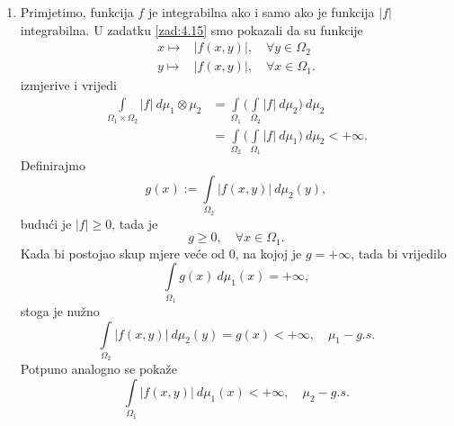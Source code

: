 \begin{rj}[\ref{zad:4.16}]
    \begin{enumerate}[label=(\roman*)]
        \item   \label{rj:4.16.1}
        Primjetimo, funkcija $f$ je integrabilna ako i samo ako je funkcija $|f|$ integrabilna.
        U zadatku \ref{zad:4.15} smo pokazali da su funkcije
        \begin{equation*}
            \begin{aligned}
                x \mapsto& |f (x, y)|, \quad \forall y \in \Omega_2\\
                y \mapsto& |f (x, y)|, \quad \forall x \in \Omega_1.
            \end{aligned}
        \end{equation*}
        izmjerive i vrijedi
        \begin{equation*}
            \begin{aligned}
                \int\limits_{\Omega_1 \times \Omega_2} |f| \: d \mu_1 \otimes \mu_2 &= \int\limits_{\Omega_1} \Big( \int\limits_{\Omega_2} |f| \: d \mu_2 \Big) \: d \mu_2\\
                &= \int\limits_{\Omega_2} \Big( \int\limits_{\Omega_1} |f| \: d \mu_1 \Big) \: d \mu_2 < +\infty.
            \end{aligned}
        \end{equation*}
        Definirajmo
        \begin{equation*}
            g (x) := \int\limits_{\Omega_2} |f (x, y)| \: d \mu_2 (y),
        \end{equation*}
        budu\' ci je $|f| \geq 0$, tada je
        \begin{equation*}
            g \geq 0, \quad \forall x \in \Omega_1.
        \end{equation*}
        Kada bi postojao skup mjere ve\' ce od 0, na kojoj je $g = +\infty$, tada bi vrijedilo
        \begin{equation*}
            \int\limits_{\Omega_1} g(x) \: d \mu_1 (x) = +\infty,
        \end{equation*}
        stoga je nu\v zno
        \begin{equation*}
            \int\limits_{\Omega_2} |f (x, y)| \: d \mu_2 (y) = g (x) < +\infty, \quad \mu_1 - g.s.
        \end{equation*}
        Potpuno analogno se poka\v ze
        \begin{equation*}
            \int\limits_{\Omega_1} |f (x, y)| \: d \mu_1 (x) < +\infty, \quad \mu_2 - g.s.
        \end{equation*}


\end{enumerate}
\end{rj}
